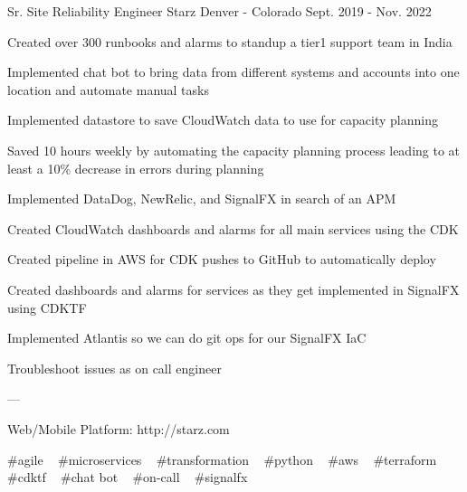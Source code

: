 \begin{cventries}
  \cventry
    {Sr. Site Reliability Engineer} %
    {Starz} %
    {Denver - Colorado} %
    {Sept. 2019 - Nov. 2022} %
    {
      \begin{cvitems} %
        \item {Created over 300 runbooks and alarms to standup a tier1 support team in India}
        \item {Implemented chat bot to bring data from different systems and accounts into one location and automate manual tasks}
        \item {Implemented datastore to save CloudWatch data to use for capacity planning}
        \item {Saved 10 hours weekly by automating the capacity planning process leading to at least a 10\% decrease in errors during planning}
        \item {Implemented DataDog, NewRelic, and SignalFX in search of an APM}
        \item {Created CloudWatch dashboards and alarms for all main services using the CDK}
        \item {Created pipeline in AWS for CDK pushes to GitHub to automatically deploy}
        \item {Created dashboards and alarms for services as they get implemented in SignalFX using CDKTF}
        \item {Implemented Atlantis so we can do git ops for our SignalFX IaC}
        \item {Troubleshoot issues as on call engineer}
        \item {---}
        \item {Web/Mobile Platform: http://starz.com}
      \end{cvitems}
    }
    {
      \#agile ~
      \#microservices ~
      \#transformation ~
      \#python ~
      \#aws ~
      \#terraform ~
      \#cdktf ~
      \#chat bot ~
      \#on-call ~
      \#signalfx ~
    }


\end{cventries}
